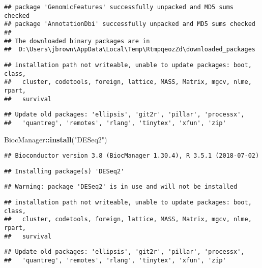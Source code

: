 \documentclass[]{article}
\newenvironment{Shaded}{\begin{snugshade}}{\end{snugshade}}
\newcommand{\KeywordTok}[1]{\textcolor[rgb]{0.13,0.29,0.53}{\textbf{#1}}}
\newcommand{\StringTok}[1]{\textcolor[rgb]{0.31,0.60,0.02}{#1}}
\newcommand{\OperatorTok}[1]{\textcolor[rgb]{0.81,0.36,0.00}{\textbf{#1}}}
\newcommand{\NormalTok}[1]{#1}
\begin{document}
\begin{verbatim}
## package 'GenomicFeatures' successfully unpacked and MD5 sums checked
## package 'AnnotationDbi' successfully unpacked and MD5 sums checked
## 
## The downloaded binary packages are in
##  D:\Users\jbrown\AppData\Local\Temp\RtmpqeozZd\downloaded_packages
\end{verbatim}

\begin{verbatim}
## installation path not writeable, unable to update packages: boot, class,
##   cluster, codetools, foreign, lattice, MASS, Matrix, mgcv, nlme, rpart,
##   survival
\end{verbatim}

\begin{verbatim}
## Update old packages: 'ellipsis', 'git2r', 'pillar', 'processx',
##   'quantreg', 'remotes', 'rlang', 'tinytex', 'xfun', 'zip'
\end{verbatim}

\begin{Shaded}
\begin{Highlighting}[]
\NormalTok{BiocManager}\OperatorTok{::}\KeywordTok{install}\NormalTok{(}\StringTok{"DESeq2"}\NormalTok{)}
\end{Highlighting}
\end{Shaded}

\begin{verbatim}
## Bioconductor version 3.8 (BiocManager 1.30.4), R 3.5.1 (2018-07-02)
\end{verbatim}

\begin{verbatim}
## Installing package(s) 'DESeq2'
\end{verbatim}

\begin{verbatim}
## Warning: package 'DESeq2' is in use and will not be installed
\end{verbatim}

\begin{verbatim}
## installation path not writeable, unable to update packages: boot, class,
##   cluster, codetools, foreign, lattice, MASS, Matrix, mgcv, nlme, rpart,
##   survival
\end{verbatim}

\begin{verbatim}
## Update old packages: 'ellipsis', 'git2r', 'pillar', 'processx',
##   'quantreg', 'remotes', 'rlang', 'tinytex', 'xfun', 'zip'
\end{verbatim}
\end{document}
